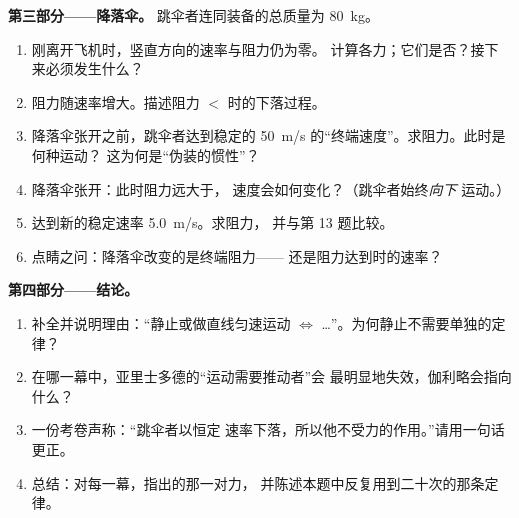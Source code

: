 \begin{problem}
\medskip
\noindent\textbf{第三部分——降落伞。}
跳伞者连同装备的总质量为 \qty{80}{kg}。
\begin{enumerate}[resume]
  \item 刚离开飞机时，竖直方向的速率与阻力仍为零。
        计算各力；它们是否？接下来必须发生什么？
  \item 阻力随速率增大。描述阻力 $<$ 时的下落过程。
  \item 降落伞张开之前，跳伞者达到稳定的
        \qty{50}{m/s} 的“终端速度”。求阻力。此时是何种运动？
        这为何是“伪装的惯性”？
  \item 降落伞张开：此时阻力远大于，
        速度会如何变化？（跳伞者始终\emph{向下}
        运动。）
  \item 达到新的稳定速率 \qty{5.0}{m/s}。求阻力，
        并与第 13 题比较。
  \item 点睛之问：降落伞改变的是终端阻力——
        还是阻力达到时的速率？
\end{enumerate}

\medskip
\noindent\textbf{第四部分——结论。}
\begin{enumerate}[resume]
  \item 补全并说明理由：“静止或做直线匀速运动
        $\iff$ \dots”。为何静止不需要单独的定律？
  \item 在哪一幕中，亚里士多德的“运动需要推动者”会
        最明显地失效，伽利略会指向什么？
  \item 一份考卷声称：“跳伞者以恒定
        速率下落，所以他不受力的作用。”请用一句话更正。
  \item 总结：对每一幕，指出的那一对力，
        并陈述本题中反复用到二十次的那条定律。
\end{enumerate}
\end{problem}
